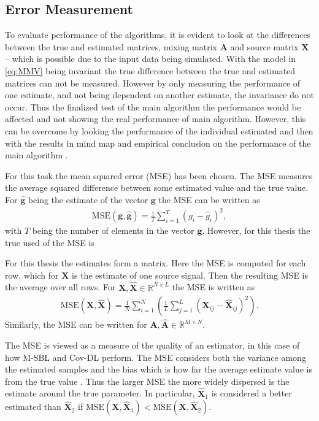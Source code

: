 \subsection{Error Measurement}\label{sec:mse}  
To evaluate performance of the algorithms, it is evident to look at the differences between the true and estimated matrices, mixing matrix $\mathbf{A}$ and source matrix $\mathbf{X}$ -- which is possible due to the input data being simulated. 
With the model in \eqref{eq:MMV} being invariant the true difference between the true and estimated matrices can not be measured. 
However by only measuring the performance of one estimate, and not being dependent on another estimate, the invariance do not occur. 
Thus the finalized test of the main algorithm the performance would be affected and not showing the real performance of main algorithm. 
However, this can be overcome by looking the performance of the individual estimated and then with the results in mind map and empirical conclusion on the performance of the main algorithm  .

For this task the mean squared error (MSE) has been chosen. 
The MSE measures the average squared difference between some estimated value and the true value. 
For $\hat{\textbf{g}}$ being the estimate of the vector $\textbf{g}$ the MSE can be written as 
\begin{align*}
\text{MSE}(\textbf{g},\hat{\textbf{g}}) = \frac{1}{T} \sum_{i=1}^T (g_i - \hat{g}_i)^2, 
\end{align*}
with $T$ being the number of elements in the vector $\textbf{g}$. 
However, for this thesis the true used of the MSE is

For this thesis the estimates form a matrix. 
Here the MSE is computed for each row, which for $\mathbf{X}$ is the estimate of one source signal. 
Then the resulting MSE is the average over all rows. 
For $\mathbf{X}, \hat{\mathbf{X}} \in \mathbb{R}^{N \times L}$ the MSE is written as 
\begin{align*}
\text{MSE}(\mathbf{X},\hat{\mathbf{X}}) = \frac{1}{N} \sum_{i=1}^{N} \left( \frac{1}{L} \sum_{j=1}^L (\mathbf{X}_{ij} - \hat{\mathbf{X}}_{ij})^2\right).  
\end{align*}
Similarly, the MSE can be written for $\mathbf{A},\hat{\mathbf{A}} \in \mathbb{R}^{M \times N}$.  

The MSE is viewed as a measure of the quality of an estimator, in this case of how M-SBL and Cov-DL perform. 
The MSE considers both the variance among the estimated samples and the bias which is how far the average estimate value is from the true value \cite[p.305]{MSE_book}.  
Thus the larger MSE the more widely dispersed is the estimate around the true parameter.
In particular, $\hat{\mathbf{X}}_1$ is considered  a better estimated than $\hat{\mathbf{X}}_2$ if $\text{MSE}(\mathbf{X},\hat{\mathbf{X}}_1)< \text{MSE}(\mathbf{X},\hat{\mathbf{X}}_2)$. 
